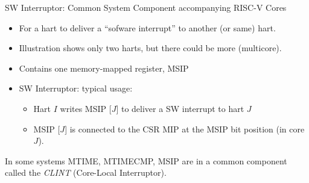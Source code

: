 \documentclass{article}
\begin{document}
\begin{center}
  {\Huge
    SW Interruptor: Common System Component accompanying RISC-V Cores}

  \vspace*{0.2in}


  \vspace*{0.3in}

  \begin{minipage}[t]{9in}
    \begin{itemize}\LARGE
    \item For a hart to deliver a ``sofware interrupt'' to another (or same) hart.
    \item Illustration shows only two harts, but there could be more (multicore).
    \item Contains one memory-mapped register, MSIP
    \item SW Interruptor: typical usage:
      \begin{itemize}
      \item Hart $I$ writes MSIP [$J$] to deliver a SW interrupt to hart $J$
      \item MSIP [$J$] is connected to the CSR MIP at the MSIP bit position (in core $J$).
      \end{itemize}
    \end{itemize}

    \vspace{0.3in}

    \begin{center}
    {\large In some systems MTIME, MTIMECMP, MSIP are in a common
      component called the \emph{CLINT} (Core-Local Interruptor).}
    \end{center}

  \end{minipage}
\end{center}
\end{document}
